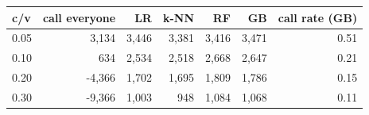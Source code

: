 \begin{tabular}{lrrrrrr}
\toprule
c/v & call everyone & LR & k-NN & RF & GB & call rate (GB) \\
\midrule
0.05 & 3,134 & 3,446 & 3,381 & 3,416 & 3,471 & 0.51 \\
0.10 & 634 & 2,534 & 2,518 & 2,668 & 2,647 & 0.21 \\
0.20 & -4,366 & 1,702 & 1,695 & 1,809 & 1,786 & 0.15 \\
0.30 & -9,366 & 1,003 & 948 & 1,084 & 1,068 & 0.11 \\
\bottomrule
\end{tabular}